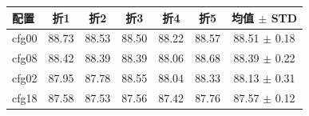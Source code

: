 \begin{tabular}{lcccccc}
\toprule
配置 & 折1 & 折2 & 折3 & 折4 & 折5 & 均值 $\pm$ STD \\
\midrule
cfg00 & 88.73 & 88.53 & 88.50 & 88.22 & 88.57 & 88.51 $\pm$ 0.18 \\
cfg08 & 88.42 & 88.39 & 88.39 & 88.06 & 88.68 & 88.39 $\pm$ 0.22 \\
cfg02 & 87.95 & 87.78 & 88.55 & 88.04 & 88.33 & 88.13 $\pm$ 0.31 \\
cfg18 & 87.58 & 87.53 & 87.56 & 87.42 & 87.76 & 87.57 $\pm$ 0.12 \\
\bottomrule
\end{tabular}
